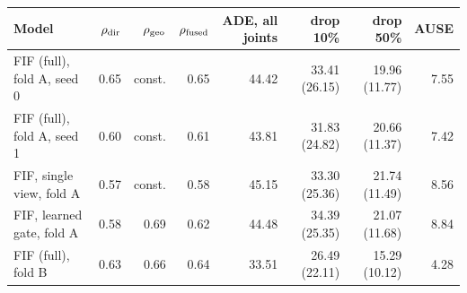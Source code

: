 \begin{tabular}{@{}lrrrrrrr@{}}
\toprule
Model & $\rho_{\rm dir}$ & $\rho_{\rm geo}$ & $\rho_{\rm fused}$ & ADE, all joints & drop 10\% & drop 50\% & AUSE \\
\midrule
FIF (full), fold A, seed 0 & 0.65 & const. & 0.65 & 44.42 & 33.41 (26.15) & 19.96 (11.77) & 7.55 \\
FIF (full), fold A, seed 1 & 0.60 & const. & 0.61 & 43.81 & 31.83 (24.82) & 20.66 (11.37) & 7.42 \\
FIF, single view, fold A & 0.57 & const. & 0.58 & 45.15 & 33.30 (25.36) & 21.74 (11.49) & 8.56 \\
FIF, learned gate, fold A & 0.58 & 0.69 & 0.62 & 44.48 & 34.39 (25.35) & 21.07 (11.68) & 8.84 \\
FIF (full), fold B & 0.63 & 0.66 & 0.64 & 33.51 & 26.49 (22.11) & 15.29 (10.12) & 4.28 \\
\bottomrule
\end{tabular}

